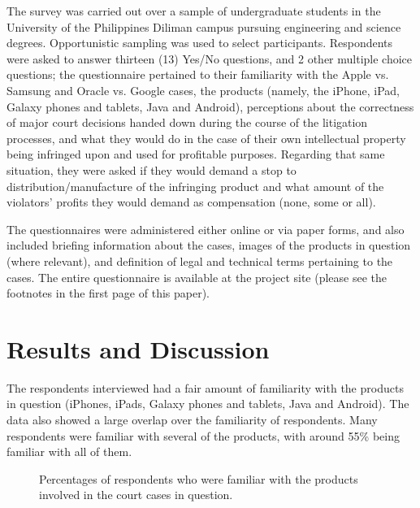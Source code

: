 \documentclass[prodmode,cs196]{acmlarge}
\begin{document}
The survey was carried out over a sample of undergraduate students in the University of the Philippines Diliman campus pursuing engineering and science degrees. Opportunistic sampling was used to select participants. Respondents were asked to answer thirteen (13) Yes/No questions, and 2 other multiple choice questions; the questionnaire pertained to their familiarity with the Apple vs. Samsung and Oracle vs. Google cases, the products (namely, the iPhone, iPad, Galaxy phones and tablets, Java and Android), perceptions about the correctness of major court decisions handed down during the course of the litigation processes, and what they would do in the case of their own intellectual property being infringed upon and used for profitable purposes. Regarding that same situation, they were asked if they would demand a stop to distribution/manufacture of the infringing product and what amount of the violators' profits they would demand as compensation (none, some or all).

The questionnaires were administered either online or via paper forms, and also included briefing information about the cases, images of the products in question (where relevant), and definition of legal and technical terms pertaining to the cases. The entire questionnaire is available at the project site (please see the footnotes in the first page of this paper).

\section{Results and Discussion}

The respondents interviewed had a fair amount of familiarity with the products in question (iPhones, iPads, Galaxy phones and tablets, Java and Android). The data also showed a large overlap over the familiarity of respondents. Many respondents were familiar with several of the products, with around 55\% being familiar with all of them.

\begin{figure}[H]
	\begin{bchart}[min=0, step=10 ,max=100]
            \smallskip
            \smallskip
			\smallskip
    \end{bchart}
	\caption{Percentages of respondents who were familiar with the products involved in the court cases in question.}
\end{figure}
\end{document}

